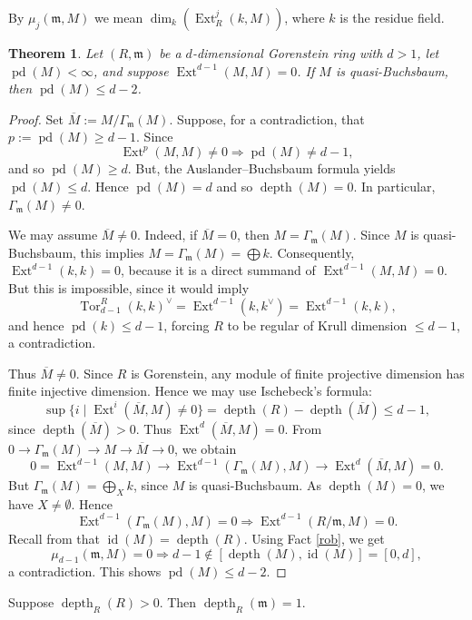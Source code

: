 \documentclass[11.05pt,a4paper]{amsart}
\newtheorem{theorem}{Theorem}[section]
\theoremstyle{definition}
\theoremstyle{remark}
\newcommand{\id}{\operatorname{id}}
\newcommand{\pd}{\operatorname{pd}}
\newcommand{\Ext}{\operatorname{Ext}}
\newcommand{\Tor}{\operatorname{Tor}}
\newcommand{\depth}{\operatorname{depth}}
\newcommand{\lo}{\longrightarrow}
\begin{document}
By $ \mu_{j}(\mathfrak{m}, M)$ we mean $\dim_k(\Ext^j_{R}(k, M))$, where $k$ is the residue field.

\begin{theorem}
	Let $(R,\mathfrak{m})$ be a $d$-dimensional Gorenstein ring with $d>1$, let $\pd(M) < \infty$, and suppose $\Ext^{d-1}(M,M)=0$. If $M$ is quasi-Buchsbaum, then $\pd(M) \leq d-2$.
\end{theorem}

\begin{proof}
	Set  $\overline{M} := M/\Gamma_{\mathfrak{m}}(M)$.
	Suppose, for a contradiction, that $p:=\pd(M) \geq d-1$. Since
	$$\Ext^p(M,M) \neq 0 \Rightarrow \pd(M) \neq d-1,$$
and so $\pd(M) \geq d$. But,	the Auslander–Buchsbaum formula yields $\pd(M) \leq d$. Hence $\pd(M) = d$ and so $\depth(M) = 0$. In particular, $ \Gamma_{\mathfrak{m}}(M) \neq 0$.
	
	We may assume $\overline{M} \neq 0$. Indeed, if $\overline{M} = 0$, then $ M = \Gamma_{\mathfrak{m}}(M)$. Since $M$ is quasi-Buchsbaum, this implies $M=\Gamma_{\mathfrak{m}}(M)=\bigoplus k$. Consequently, $\Ext^{d-1}(k,k) = 0$, because it is a direct summand of $\Ext^{d-1}(M,M)=0$. But this is impossible, since it would imply
	$$\Tor^R_{d-1}(k,k)^\vee = \Ext^{d-1}(k,k^\vee) = \Ext^{d-1}(k,k),$$
	and hence $\pd(k) \leq d-1$, forcing $R$ to be regular of Krull dimension $\leq d-1$, a contradiction.
	
	Thus $\overline{M} \neq 0$. Since $R$ is Gorenstein, any module of finite projective dimension has finite injective dimension. Hence we may use Ischebeck's formula:
	\[
	\sup\{i \mid \Ext^i(\overline{M},M) \neq 0\} = \depth(R) - \depth(\overline{M})\leq d-1,
	\]
	since $\depth(\overline{M})>0$. Thus $\Ext^d(\overline{M},M) = 0$.
	From $0 \rightarrow \Gamma_{\mathfrak{m}}(M) \rightarrow M \rightarrow \overline{M} \rightarrow 0$, we obtain
	\[
	0= \Ext^{d-1}(M,M) \lo \Ext^{d-1}(\Gamma_{\mathfrak{m}}(M),M) \lo \Ext^d(\overline{M},M)=0.
	\]
But $\Gamma_{\mathfrak{m}}(M) = \bigoplus_X k$, since $M$ is quasi-Buchsbaum. As $\depth(M)=0$, we have $X\neq \emptyset$. Hence
	$$\Ext^{d-1}(\Gamma_{\mathfrak{m}}(M),M)=0 \Rightarrow \Ext^{d-1}(R/\mathfrak{m}, M) = 0.$$
	Recall from \cite[3.1.17]{BH} that $\id(M)=\depth(R)$. Using Fact \ref{rob}, we get
	$$\mu_{d-1}(\mathfrak{m},M) = 0 \Rightarrow d-1 \notin [\depth(M), \id(M)] = [0,d],$$
	a contradiction. This shows $\pd(M) \leq d-2$.
\end{proof}
\begin{fact}\label{depth}
	Suppose $\depth_R(R) >0$. Then $\depth_R(\mathfrak{m}) =1$.
\end{fact}
\end{document}
